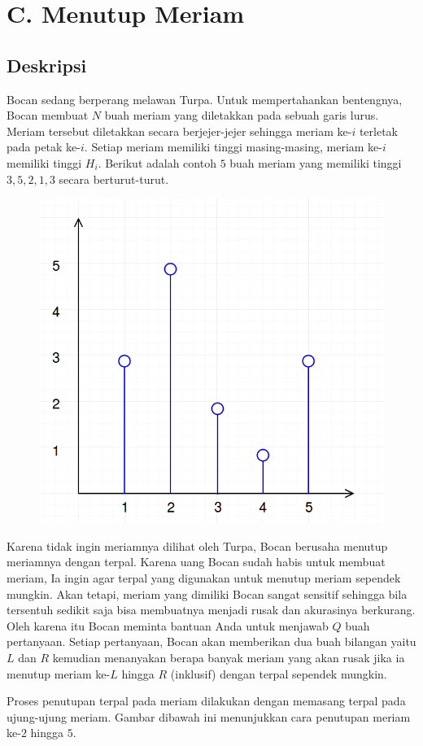 \documentclass{article}
\begin{document}
\pagestyle{fancy}
\fancyhf{}
\renewcommand{\headrulewidth}{0pt}

\section*{\hfil C. Menutup Meriam\hfil}


\subsection*{Deskripsi}

\par\noindent Bocan sedang berperang melawan Turpa. Untuk mempertahankan bentengnya, Bocan membuat $N$ buah meriam yang diletakkan pada sebuah garis lurus. Meriam tersebut diletakkan secara berjejer-jejer sehingga meriam ke-$i$ terletak pada petak ke-$i$. Setiap meriam memiliki tinggi masing-masing, meriam ke-$i$ memiliki tinggi $H_i$. Berikut adalah contoh $5$ buah meriam yang memiliki tinggi $3, 5, 2, 1, 3$ secara berturut-turut.

\begin{figure}[h!]
	\centering
	\includegraphics[width=0.2\linewidth]{meriam1.png}
\end{figure}

\par\noindent Karena tidak ingin meriamnya dilihat oleh Turpa, Bocan berusaha menutup meriamnya dengan terpal. Karena uang Bocan sudah habis untuk membuat meriam, Ia ingin agar terpal yang digunakan untuk menutup meriam sependek mungkin. Akan tetapi, meriam yang dimiliki Bocan sangat sensitif sehingga bila tersentuh sedikit saja bisa membuatnya menjadi rusak dan akurasinya berkurang. Oleh karena itu Bocan meminta bantuan Anda untuk menjawab $Q$ buah pertanyaan. Setiap pertanyaan, Bocan akan memberikan dua buah bilangan yaitu $L$ dan $R$ kemudian menanyakan berapa banyak meriam yang akan rusak jika ia menutup meriam ke-$L$ hingga $R$ (inklusif) dengan terpal sependek mungkin.
\newline
\par\noindent Proses penutupan terpal pada meriam dilakukan dengan memasang terpal pada ujung-ujung meriam. Gambar dibawah ini menunjukkan cara penutupan meriam ke-$2$ hingga $5$.
\end{document}
